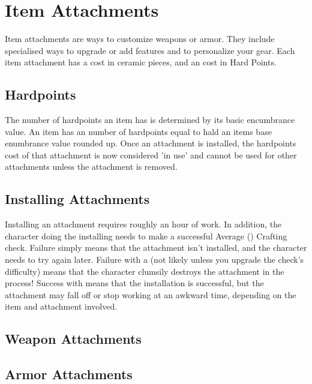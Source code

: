 
\hrulefill

\hrulefill


\FloatBarrier
\section{Item Attachments}

Item attachments are ways to customize weapons or armor. They include specialised
ways to upgrade or add features and to personalize your gear. Each item attachment
has a cost in ceramic pieces, and an cost in Hard Points.

\begin{multicols}{2}
\subsection{Hardpoints}
The number of hardpoints an item has is determined by its basic encumbrance value.
An item has an number of hardpoints equal to hald an items base enumbrance value
rounded up. Once an attachment is installed, the hardpoints cost of that attachment
is now considered 'in use' and cannot be used for other attachments unless the
attachment is removed.

\subsection{Installing Attachments}

Installing an attachment requires roughly an hour of work. In addition, the character
doing the installing needs to make a successful  Average (\difficulty\difficulty)
Crafting check. Failure simply means that the attachment isn't installed, and the
character needs to try again later. Failure with a \despair (not likely unless you
upgrade the check's difficulty) means that the character clumsily destroys the
attachment in the process! Success with \despair means that the installation is
successful, but the attachment may fall off or stop working at an awkward time,
depending on the item and attachment involved.

\subsection{Weapon Attachments}










\subsection{Armor Attachments}








\end{multicols}

